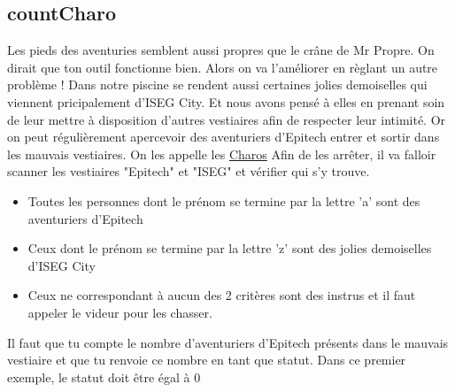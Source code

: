 \documentclass[a4paper, 12pt]{article}
\begin{document}
{    


    \vspace{3cm}

    \subsection{countCharo}

    Les pieds des aventuries semblent aussi propres que le crâne de Mr Propre.
    On dirait que ton outil fonctionne bien. Alors on va l'améliorer en règlant
    un autre problème !
    \newline \newline
    Dans notre piscine se rendent aussi certaines jolies demoiselles qui viennent pricipalement
    d'ISEG City. Et nous avons pensé à elles en prenant soin de leur mettre à disposition d'autres vestiaires
    afin de respecter leur intimité. Or on peut régulièrement apercevoir des aventuriers d'Epitech
    entrer et sortir dans les mauvais vestiaires.
    \newline \newline
    On les appelle les \underline{Charos}
    \newline \newline
    Afin de les arrêter, il va falloir scanner les vestiaires "Epitech" et "ISEG" et vérifier qui s'y trouve.
    \newline
    \begin{itemize}
        \item Toutes les personnes dont le prénom se termine par la lettre 'a' sont des aventuriers d'Epitech
        \item Ceux dont le prénom se termine par la lettre 'z' sont des jolies demoiselles d'ISEG City
        \item Ceux ne correspondant à aucun des 2 critères sont des instrus et il faut appeler le videur pour les chasser.
    \end{itemize}

    \vspace{0.6cm}

    Il faut que tu compte le nombre d'aventuriers d'Epitech présents dans le mauvais vestiaire et que
    tu renvoie ce nombre en tant que statut.
    \newline \newline
    Dans ce premier exemple, le statut doit être égal à 0

}
\end{document}
